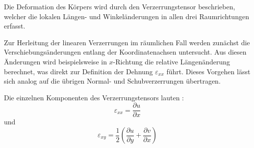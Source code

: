 Die Deformation des Körpers wird durch den Verzerrungstensor beschrieben, welcher die lokalen Längen- und Winkeländerungen in allen drei Raumrichtungen erfasst.

Zur Herleitung der linearen Verzerrungen im räumlichen Fall werden zunächst die Verschiebungsänderungen entlang der Koordinatenachsen untersucht. 
Aus diesen Änderungen wird beispielsweise in $x$-Richtung die relative Längenänderung berechnet, was direkt zur Definition der Dehnung $\varepsilon_{xx}$ führt. 
Dieses Vorgehen lässt sich analog auf die übrigen Normal- und Schubverzerrungen übertragen.

Die einzelnen Komponenten des Verzerrungstensors lauten \cite{elastomechanik:Technische_Mechanik_2:Elastostatik}:
	\begin{equation}
		\varepsilon_{xx} =
		\frac{\partial u}{\partial x}
	\end{equation}
	und
	\begin{equation}
		\varepsilon_{xy} =
		\frac{1}{2} \left( \frac{\partial u}{\partial y} + \frac{\partial v}{\partial x} \right)
	\end{equation}


